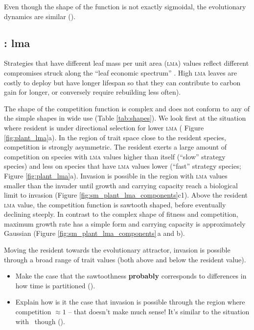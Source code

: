 \documentclass[a4paper,11pt]{article}
\begin{document}
Even though the shape of the function is not exactly sigmoidal, the
evolutionary dynamics are similar (\TODO).

\subsection{\plant: lma}
Strategies that have different leaf mass per unit area (\textsc{lma})
values reflect different compromises struck along the ``leaf economic spectrum''
\citep{Reich-1997,Wright-2004}.  High \textsc{lma} leaves are
costly to deploy but have longer lifespan so that they can contribute
to carbon gain for longer, or conversely require rebuilding less
often).

The shape of the competition function is complex and does not conform
to any of the simple shapes in wide use (Table \ref{tab:shapes}).
We look first at the situation where resident is under directional
selection for lower \textsc{lma} ( Figure \ref{fig:plant_lma}a).
%
In the region of trait space close to the resident species,
competition is strongly asymmetric. The resident exerts a large amount
of competition on species with \textsc{lma} values higher than itself (``slow''
strategy species) and less on species that have \textsc{lma} values lower
(``fast'' strategy species; Figure \ref{fig:plant_lma}a).  Invasion is
possible in the region with \textsc{lma} values smaller than the invader until
growth and carrying capacity reach a biological limit to invasion
(Figure \ref{fig:sm_plant_lma_components}c1).
%
Above the resident \textsc{lma} value, the competition function is sawtooth
shaped, before eventually declining steeply.
%
In contrast to the complex shape of fitness and competition, maximum
growth rate has a simple form and carrying capacity is approximately
Gaussian (Figure \ref{fig:sm_plant_lma_components}\,a and b).

Moving the resident towards the evolutionary attractor, invasion is
possible through a broad range of trait values (both above and below
the resident value).
\begin{itemize}
\item Make the case that the sawtoothness \textbf{probably} corresponds to
  differences in how time is partitioned (\TODO).

\item Explain how is it the case that invasion is possible through the
  region where competition $\approx 1$ -- that doesn't make much sense!
  It's similar to the situation with \hmat\ though (\TODO).
\end{itemize}
\end{document}
